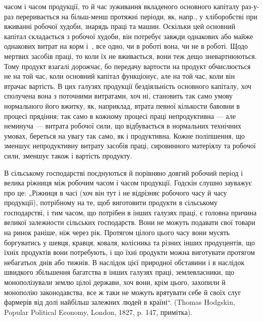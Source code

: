\parcont{}  %
часом і часом продукції, то й час зуживання вкладеного основного капіталу раз-у-раз переривається на
більш-менш протяжні періоди, як, напр., у хліборобстві при вживанні робочої худоби, знарядь праці та
машин. Оскільки цей основний капітал складається з робочої худоби, він потребує завжди однакових або
майже однакових витрат на корм і~, все одно, чи в роботі вона, чи не в роботі. Щодо мертвих
засобів праці, то коли їх не вживається, вони теж дещо зневартнюються. Тому продукт взагалі
дорожчає, бо передачу вартости на продукт обчислюється не на той час, коли основний капітал
функціонує, але на той час, коли він втрачає вартість. В цих галузях продукції бездіяльність
основного капіталу, хоч сполучена вона з поточними витратами, хоч ні, становить так само умову
нормального його вжитку, як, наприклад, втрата певної кількости бавовни в процесі прядіння; так само
в кожному процесі праці непродуктивна — але неминуча — витрата робочої сили, що відбувається в
нормальних технічних умовах, береться на увагу так само, як і продуктивна. Кожне поліпшення, що
зменшує непродуктивну витрату засобів праці, сировинного матеріялу та робочої сили, зменшує також і
вартість продукту.

В сільському господарстві поєднуються й порівняно довгий робочий період і велика ріжниця між робочим
часом і часом продукції. Годскін слушно зауважує про це: „Ріжниця в часі (хоч він тут і не відрізняє
робочого часу й часу продукції), потрібному на те, щоб виготовити продукти в сільському
господарстві, і тим часом, що потрібен в інших галузях праці, є головна причина великої залежности
сільських господарств. Вони не можуть подавати свої товари на ринок раніше, ніж через рік. Протягом
цілого цього часу вони мусять боргуватись у шевця, кравця, коваля, колісника та різних інших
продуцентів, що їхніх продуктів вони потребують, і що їхні продукти можна виготувати протягом
небагатьох днів або тижнів. В наслідок цієї природної обставини і в наслідок швидкого збільшення
багатства в інших галузях праці, землевласники, що монополізували землю цілої держави, хоч вони,
крім цього, захопили й монополію законодавства, все ж таки не можуть врятувати себе й своїх слуг
фармерів від долі найбільш залежних людей в країні“. (Thomas Hodgskin, Popular Political Economy,
London, 1827, p. 147, примітка).

